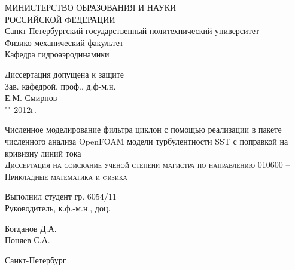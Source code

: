 \begin{titlepage}
	\begin{center}
		\small{МИНИСТЕРСТВО ОБРАЗОВАНИЯ И НАУКИ \\ РОССИЙСКОЙ ФЕДЕРАЦИИ \\
Санкт-Петербургский государственный политехнический университет \\
Физико-механический факультет \\
Кафедра гидроаэродинамики}\\
		\vspace{0.05\textheight}
	\end{center}
	\begin{flushright}
		\normalsize
			Диссертация допущена к защите \\
			Зав. кафедрой, проф., д.ф-м.н.\\
			\underline{\hspace{7em}} Е.М. Смирнов \\
			"\underline{\hspace{2em}}" \underline{\hspace{9em}} 2012г. \\
	\end{flushright}
	\begin{center}
		\vspace{0.1\textheight}
		\large{Численное моделирование фильтра циклон с помощью реализации в пакете численного анализа OpenFOAM модели турбулентности SST с поправкой на кривизну линий тока}\\
		\vspace{0.01\textheight}
		\normalsize
		\textsc{Диссертация на соискание ученой степени магистра по направлению 010600 – Прикладные математика и физика}
		\vspace{0.2\textheight}
	\end{center}
	\begin{minipage}{0.48\textwidth}
		\begin{flushleft}
			Выполнил студент гр. 6054/11\\
			Руководитель, к.ф.-м.н., доц.\\
		\end{flushleft}
	\end{minipage}
	\begin{minipage}{0.5\textwidth}
		\begin{flushright}
			Богданов Д.А. \\
			Поняев С.А. \\
		\end{flushright}
	\end{minipage}
	\vspace{0.1\textheight}
	\begin{center}
		Санкт-Петербург \\
		\the\year
	\end{center}
\end{titlepage}
\newpage
